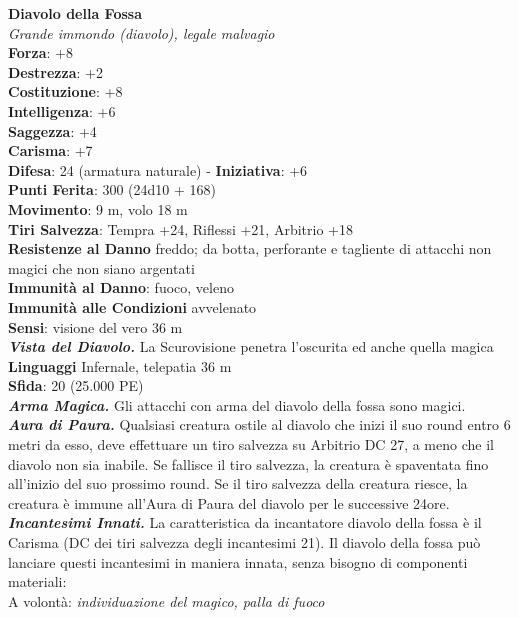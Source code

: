 \begin{multicols}{2}
\medskip\textbf{Diavolo della Fossa}\\
\emph{Grande immondo (diavolo), legale malvagio}\\
\textbf{Forza}: +8\\
\textbf{Destrezza}: +2\\
\textbf{Costituzione}: +8\\
\textbf{Intelligenza}: +6\\
\textbf{Saggezza}: +4\\
\textbf{Carisma}: +7\\
\textbf{Difesa}: 24 (armatura naturale) - \textbf{Iniziativa}: +6\\
\textbf{Punti Ferita}: 300 (24d10 + 168)\\
\textbf{Movimento}: 9 m, volo 18 m\\
\textbf{Tiri Salvezza}: Tempra +24, Riflessi +21, Arbitrio +18\\
\textbf{Resistenze al Danno} freddo; da botta, perforante e tagliente di attacchi non magici che non siano argentati\\
\textbf{Immunità al Danno}: fuoco, veleno\\
\textbf{Immunità alle Condizioni} avvelenato\\
\textbf{Sensi}: visione del vero 36 m\\
\emph{\textbf{Vista del Diavolo.}} La Scurovisione penetra l'oscurita ed anche quella magica\\
\textbf{Linguaggi} Infernale, telepatia 36 m\\ 
\textbf{Sfida}: 20 (25.000 PE)\smallskip\\
\emph{\textbf{Arma Magica.}} Gli attacchi con arma del diavolo della fossa sono magici.\\
\emph{\textbf{Aura di Paura.}} Qualsiasi creatura ostile al diavolo che inizi il suo round entro 6 metri da esso, deve effettuare un tiro salvezza su Arbitrio DC  27, a meno che il diavolo non sia inabile. Se fallisce il tiro salvezza, la creatura è spaventata fino all'inizio del suo prossimo round. Se il tiro salvezza della creatura riesce, la creatura è immune all'Aura di Paura del diavolo per le successive 24ore. \\
\emph{\textbf{Incantesimi Innati.}} La caratteristica da incantatore diavolo della fossa è il Carisma (DC dei tiri salvezza degli incantesimi 21). Il diavolo della fossa può lanciare questi incantesimi in maniera innata, senza bisogno di componenti materiali:\\
A volontà: \emph{individuazione del magico, palla di fuoco}\\

\end{multicols}
